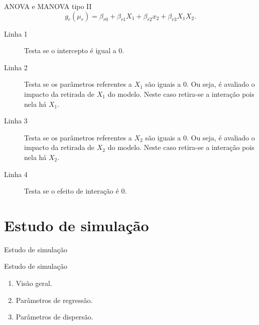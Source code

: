 \documentclass[
  ignorenonframetext,
  serif,
  professionalfont,
  usenames,
  dvipsnames,
  aspectratio = 169]{beamer}
\begin{document}
\begin{frame}{ANOVA e MANOVA tipo II}
\protect\hypertarget{anova-e-manova-tipo-ii}{}
\[
g_r(\mu_r) = \beta_{r0} + \beta_{r1} X_1 + \beta_{r2} x_2 + \beta_{r3} X_1X_2.
\]

\begin{description}
  
  \item[Linha 1] Testa se o intercepto é igual a 0.
  
  \item[Linha 2] Testa se os parâmetros referentes a $X_1$ são iguais a 0. Ou seja, é avaliado o impacto da retirada de $X_1$ do modelo. Neste caso retira-se a interação pois nela há $X_1$.
  
  \item[Linha 3] Testa se os parâmetros referentes a $X_2$ são iguais a 0. Ou seja, é avaliado o impacto da retirada de $X_2$ do modelo. Neste caso retira-se a interação pois nela há $X_2$.
  
  \item[Linha 4] Testa se o efeito de interação é 0.
  
\end{description}
\end{frame}

\hypertarget{estudo-de-simulauxe7uxe3o}{%
\section{Estudo de simulação}\label{estudo-de-simulauxe7uxe3o}}

\begin{frame}{Estudo de simulação}
\end{frame}

\begin{frame}{Estudo de simulação}
\protect\hypertarget{estudo-de-simulauxe7uxe3o-1}{}
\begin{enumerate}
    \itemsep 2ex
  
  \item Visão geral.
    
  \item Parâmetros de regressão.

  \item Parâmetros de dispersão.
 
\end{enumerate}
\end{frame}
\end{document}
